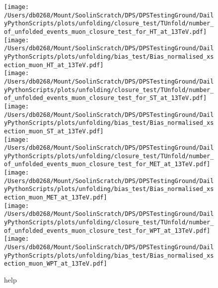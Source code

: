\begin{figure*}[htpb]
	\centering
	\texttt{[image: /Users/db0268/Mount/SoolinScratch/DPS/DPSTestingGround/DailyPythonScripts/plots/unfolding/closure\_test/TUnfold/number\_of\_unfolded\_events\_muon\_closure\_test\_for\_HT\_at\_13TeV.pdf]}
	\texttt{[image: /Users/db0268/Mount/SoolinScratch/DPS/DPSTestingGround/DailyPythonScripts/plots/unfolding/bias\_test/Bias\_normalised\_xsection\_muon\_HT\_at\_13TeV.pdf]} \\
	\texttt{[image: /Users/db0268/Mount/SoolinScratch/DPS/DPSTestingGround/DailyPythonScripts/plots/unfolding/closure\_test/TUnfold/number\_of\_unfolded\_events\_muon\_closure\_test\_for\_ST\_at\_13TeV.pdf]}
	\texttt{[image: /Users/db0268/Mount/SoolinScratch/DPS/DPSTestingGround/DailyPythonScripts/plots/unfolding/bias\_test/Bias\_normalised\_xsection\_muon\_ST\_at\_13TeV.pdf]} \\
	\texttt{[image: /Users/db0268/Mount/SoolinScratch/DPS/DPSTestingGround/DailyPythonScripts/plots/unfolding/closure\_test/TUnfold/number\_of\_unfolded\_events\_muon\_closure\_test\_for\_MET\_at\_13TeV.pdf]}
	\texttt{[image: /Users/db0268/Mount/SoolinScratch/DPS/DPSTestingGround/DailyPythonScripts/plots/unfolding/bias\_test/Bias\_normalised\_xsection\_muon\_MET\_at\_13TeV.pdf]} \\
	\texttt{[image: /Users/db0268/Mount/SoolinScratch/DPS/DPSTestingGround/DailyPythonScripts/plots/unfolding/closure\_test/TUnfold/number\_of\_unfolded\_events\_muon\_closure\_test\_for\_WPT\_at\_13TeV.pdf]}
	\texttt{[image: /Users/db0268/Mount/SoolinScratch/DPS/DPSTestingGround/DailyPythonScripts/plots/unfolding/bias\_test/Bias\_normalised\_xsection\_muon\_WPT\_at\_13TeV.pdf]} \\
	\caption[help]{help}
	\label{fig:ClosureBiasmu1}
\end{figure*}

